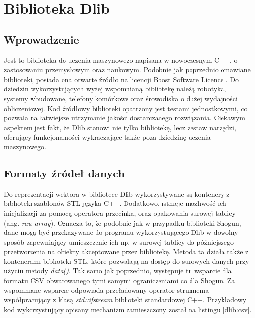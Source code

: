 \chapter{Biblioteka Dlib}

\section{Wprowadzenie}

Jest to biblioteka do uczenia maszynowego napisana w nowoczesnym C++, o zastosowaniu przemysłowym oraz naukowym. Podobnie jak poprzednio omawiane biblioteki, posiada ona otwarte źródło na licencji Boost Software Licence \cite{dlib:license}. Do dziedzin wykorzystujących wyżej wspomnianą bibliotekę należą robotyka, systemy wbudowane, telefony komórkowe oraz śrowodiska o dużej wydajności obliczeniowej. Kod źródłowy biblioteki opatrzony jest testami jednostkowymi, co pozwala na łatwiejsze utrzymanie jakości dostarczanego rozwiązania. Ciekawym aspektem jest fakt, że Dlib stanowi nie tylko bibliotekę, lecz zestaw narzędzi, oferujący funkcjonalności wykraczające także poza dziedzinę uczenia maszynowego.

\section{Formaty źródeł danych}

Do reprezentacji wektora w bibliotece Dlib wykorzystywane są kontenery z biblioteki szablonów STL języka C++. Dodatkowo, istnieje możliwość ich inicjalizacji za pomocą operatora przecinka, oraz opakowania surowej tablicy (ang. \textit{raw array}). Oznacza to, że podobnie jak w przypadku biblioteki Shogun, dane mogą być przekazywane do programu wykorzystującego Dlib w dowolny sposób zapewniający umieszczenie ich np. w surowej tablicy do późniejszego przetworzenia na obiekty akceptowane przez bibliotekę. Metoda ta działa także z kontenerami biblioteki STL, które pozwalają na dostęp do surowych danych przy użyciu metody \textit{data()}. Tak samo jak poprzednio, występuje tu wsparcie dla formatu CSV obwarowanego tymi samymi ograniczeniami co dla Shogun. Za wspomniane wsparcie odpowiada przeładowany operator strumienia współpracujący z klasą \textit{std::ifstream} biblioteki standardowej C++. Przykładowy kod wykorzystujący opisany mechanizm zamieszczony został na listingu \ref{dlib:csv}.


